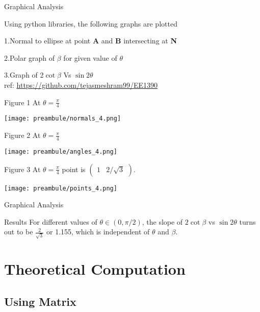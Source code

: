 \documentclass{beamer}
\begin{document}
\begin{frame}{Graphical Analysis}
\begin{block}{}
Using python libraries, the following graphs are plotted
\item  1.Normal to ellipse at point\textbf{ A }and  \textbf{B} intersecting at \textbf{N}
\item  2.Polar graph of $\beta$ for given value of $\theta$
\item  3.Graph of 2$\cot \beta$  Vs $\sin 2\theta$  
\\
ref: \url{https://github.com/tejasmeshram99/EE1390}
\end{block}
\end{frame}
\begin{frame}{Figure 1}
At $\theta =\frac{\pi}{4}$ 

\centering
\texttt{[image: preambule/normals\_4.png]}
\end{frame}
\begin{frame}{Figure 2}
At $\theta =\frac{\pi}{4}$ 

\centering
\texttt{[image: preambule/angles\_4.png]}
\end{frame}
\begin{frame}{Figure 3}
At $\theta =\frac{\pi}{4}$ point is $\begin{pmatrix}1& 2/\sqrt{3}\end{pmatrix}$.

\centering
\texttt{[image: preambule/points\_4.png]}
\end{frame}
\begin{frame}{Graphical Analysis}
\begin{block}{Results}
{\Large For different values of $\theta \in (0, \pi/2)$, the slope of  $2\cot\beta$ vs $\sin2\theta$ 
turns out
to be \alert{$\frac{2}{\sqrt{3}}$ } or \alert{1.155},
which is independent of $\theta$ and $\beta$.}
\end{block}
\end{frame}

\section{Theoretical Computation}
\subsection{Using Matrix}
\end{document}
